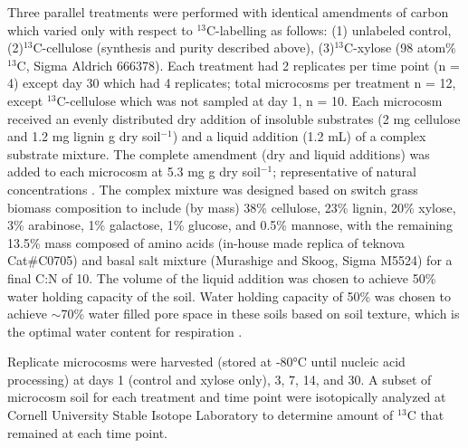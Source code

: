 \documentclass{article}
\begin{document}
Three parallel treatments were performed with identical amendments of carbon
which varied only with respect to $^{13}$C-labelling as follows:
(1) unlabeled control,(2)$^{13}$C-cellulose (synthesis and purity
described above), (3)$^{13}$C-xylose (98 atom\%
$^{13}$C, Sigma Aldrich 666378). Each treatment had 2 replicates
per time point (n = 4) except day 30 which had 4 replicates; total microcosms
per treatment n = 12, except $^{13}$C-cellulose which was not
sampled at day 1, n = 10. Each microcosm received an evenly distributed dry
addition of insoluble substrates (2 mg cellulose and 1.2 mg lignin g dry
soil$^{-1}$) and a liquid addition (1.2 mL) of a complex substrate
mixture. The complete amendment (dry and liquid additions) was added to each
microcosm at 5.3 mg g dry soil$^{-1}$; representative of natural
concentrations \citep{Schneckenberger_2008}. The complex mixture was designed
based on switch grass biomass composition \citep{Yan_2010,David_2010} to include
(by mass) 38\% cellulose, 23\% lignin, 20\% xylose, 3\% arabinose, 1\%
galactose, 1\% glucose, and 0.5\% mannose, with the remaining 13.5\% mass
composed of amino acids (in-house made replica of teknova Cat\#C0705) and basal
salt mixture (Murashige and Skoog, Sigma M5524) for a final C:N of 10. The
volume of the liquid addition was chosen to achieve 50\% water holding capacity
of the soil. Water holding capacity of 50\% was chosen to achieve $\sim$70\%
water filled pore space in these soils based on soil texture, which is the
optimal water content for respiration \citep{Linn_1984,Linn_1984}.

Replicate microcosms were harvested (stored at -80°C until nucleic acid
processing) at days 1 (control and xylose only), 3, 7, 14, and 30. A subset of
microcosm soil for each treatment and time point were isotopically analyzed at
Cornell University Stable Isotope Laboratory to determine amount of
$^{13}$C that remained at each time point.   
\end{document}
